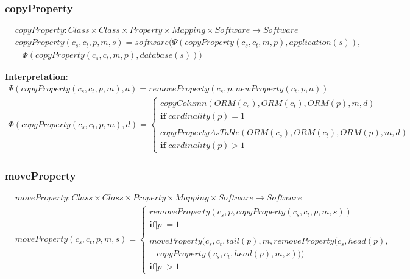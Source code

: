 \documentclass[10pt]{article}
\begin{document}
\subsubsection{copyProperty}
\begin{align}
& copyProperty: Class \times Class \times Property \times Mapping \times Software \rightarrow Software \\
& copyProperty(c_s, c_t, p, m, s) = software(\Psi(copyProperty(c_s, c_t, m, p), application(s)), \nonumber \\
& \;\;\; \Phi(copyProperty(c_s, c_t, m, p), database(s)))
\end{align}

\noindent \textbf{Interpretation}:
\begin{align}
\Psi(copyProperty(c_s, c_t, p, m), a) = removeProperty(c_s, p, newProperty(c_t, p, a))
\end{align}
\begin{align}
\Phi(copyProperty(c_s, c_t, p, m), d) = \begin{cases}
 copyColumn(ORM(c_s), ORM(c_t), ORM(p), m, d) \\
 \mathbf{if} \; cardinality(p) = 1  \\\\
 copyPropertyAsTable(ORM(c_s), ORM(c_t), ORM(p), m, d) \\ 
 \mathbf{if} \; cardinality(p) > 1
 \end{cases}
\end{align}

\subsubsection{moveProperty}
\begin{align}
& moveProperty: Class \times Class \times Property \times Mapping \times Software \rightarrow Software \\
& moveProperty(c_s, c_t, p, m, s) = \begin{cases}
removeProperty(c_s, p, copyProperty(c_s, c_t, p, m, s)) \\
\mathbf{if} |p| = 1 \\\\
moveProperty(c_s, c_t, tail(p), m, removeProperty(c_s, head(p), \\ \;\;\; copyProperty(c_s, c_t, head(p), m, s))) \\ 
\mathbf{if} |p| > 1
 \end{cases}
\end{align}
\end{document}
